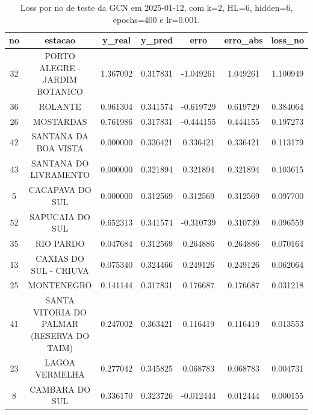 \begin{table}[h]
\centering
\caption{Loss por no de teste da GCN em 2025-01-12, com k=2, HL=6, hidden=6, epochs=400 e lr=0.001.}
\label{tab:gcn_loss_k2_hl6_h6_e400_d20250112}
\begin{tabular}{ccccccc}
\toprule
no & estacao & y\_real & y\_pred & erro & erro\_abs & loss\_no \\
\midrule
32 & PORTO ALEGRE - JARDIM BOTANICO & 1.367092 & 0.317831 & -1.049261 & 1.049261 & 1.100949 \\
36 & ROLANTE & 0.961304 & 0.341574 & -0.619729 & 0.619729 & 0.384064 \\
26 & MOSTARDAS & 0.761986 & 0.317831 & -0.444155 & 0.444155 & 0.197273 \\
42 & SANTANA DA BOA VISTA & 0.000000 & 0.336421 & 0.336421 & 0.336421 & 0.113179 \\
43 & SANTANA DO LIVRAMENTO & 0.000000 & 0.321894 & 0.321894 & 0.321894 & 0.103615 \\
5 & CACAPAVA DO SUL & 0.000000 & 0.312569 & 0.312569 & 0.312569 & 0.097700 \\
52 & SAPUCAIA DO SUL & 0.652313 & 0.341574 & -0.310739 & 0.310739 & 0.096559 \\
35 & RIO PARDO & 0.047684 & 0.312569 & 0.264886 & 0.264886 & 0.070164 \\
13 & CAXIAS DO SUL - CRIUVA & 0.075340 & 0.324466 & 0.249126 & 0.249126 & 0.062064 \\
25 & MONTENEGRO & 0.141144 & 0.317831 & 0.176687 & 0.176687 & 0.031218 \\
41 & SANTA VITORIA DO PALMAR (RESERVA DO TAIM) & 0.247002 & 0.363421 & 0.116419 & 0.116419 & 0.013553 \\
23 & LAGOA VERMELHA & 0.277042 & 0.345825 & 0.068783 & 0.068783 & 0.004731 \\
8 & CAMBARA DO SUL & 0.336170 & 0.323726 & -0.012444 & 0.012444 & 0.000155 \\
\bottomrule
\end{tabular}
\end{table}
